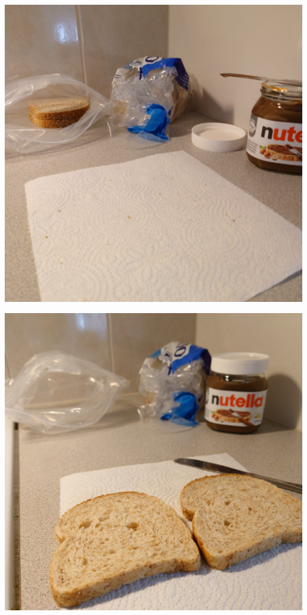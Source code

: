 \begin{multicols}{2}
\begin{Figure}\begin{center}
\noindent\includegraphics[width=0.9\linewidth]{assets/valipala5}
\end{center}\end{Figure}
\begin{Figure}\begin{center}
\noindent\includegraphics[width=0.9\linewidth]{assets/valipala2}
\vspace*{-0.32cm}
\end{center}\end{Figure}
\end{multicols}
